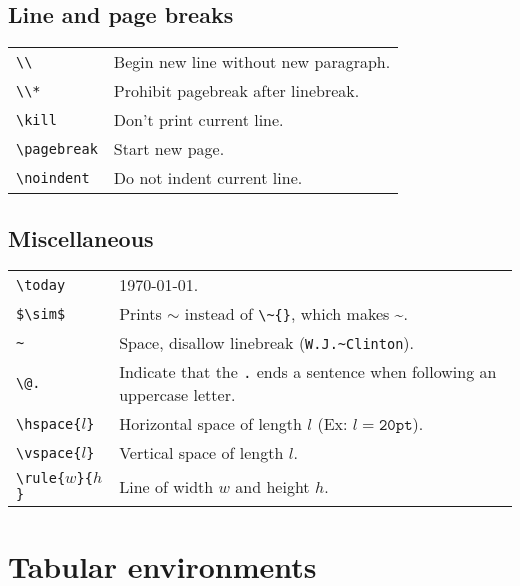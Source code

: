 \subsection{Line and page breaks}
\begin{tabular}{@{}p{\the\MyLen}%
                @{}p{\linewidth-\the\MyLen}@{}}
\verb!\\!          &  Begin new line without new paragraph.  \\
\verb!\\*!         &  Prohibit pagebreak after linebreak. \\
\verb!\kill!       &  Don't print current line. \\
\verb!\pagebreak!  &  Start new page. \\
\verb!\noindent!   &  Do not indent current line.
\end{tabular}


\subsection{Miscellaneous}
\begin{tabular}{@{}p{\the\MyLen}%
                @{}p{\linewidth-\the\MyLen}@{}}
\verb!\today!  &  \today. \\
\verb!$\sim$!  &  Prints $\sim$ instead of \verb!\~{}!, which makes \~{}. \\
\verb!~!       &  Space, disallow linebreak (\verb!W.J.~Clinton!). \\
\verb!\@.!     &  Indicate that the \verb!.! ends a sentence when following
                        an uppercase letter. \\
\verb!\hspace{!$l$\verb!}! & Horizontal space of length $l$
                                (Ex: $l=\mathtt{20pt}$). \\
\verb!\vspace{!$l$\verb!}! & Vertical space of length $l$. \\
\verb!\rule{!$w$\verb!}{!$h$\verb!}! & Line of width $w$ and height $h$. \\
\end{tabular}



\section{Tabular environments}

